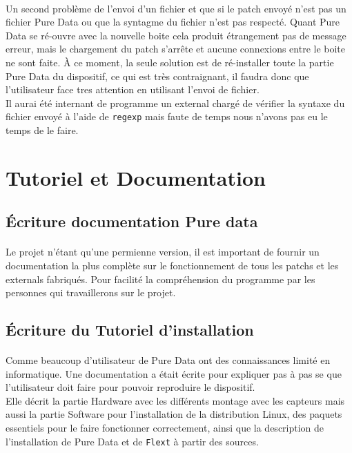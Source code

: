 \documentclass[a4paper, titlepage, oneside, 12pt]{article}%
\begin{document}
\paragraph{}
Un second problème de l'envoi d'un fichier et que si le patch envoyé n'est pas un fichier Pure Data ou que la syntagme du fichier n'est pas respecté. Quant Pure Data se ré-ouvre avec la nouvelle boite cela produit étrangement pas de message erreur, mais le chargement du patch s’arrête et aucune connexions entre le boite ne sont faite. 
À ce moment, la seule solution est de ré-installer toute la partie Pure Data du dispositif, ce qui est très contraignant, il faudra donc que l'utilisateur face tres attention en utilisant l'envoi de fichier.\\
Il aurai été internant de programme un external chargé de vérifier la syntaxe du fichier envoyé à l'aide de \texttt{regexp} mais faute de temps nous n'avons pas eu le temps de le faire.   

\section{Tutoriel et Documentation}
\subsection{Écriture documentation Pure data}
\paragraph{}
Le projet n’étant qu'une permienne version, il est important de fournir un documentation la plus complète sur le fonctionnement de tous les patchs et les externals fabriqués. Pour facilité la compréhension du programme par les personnes qui travaillerons sur le projet.
\subsection{Écriture du Tutoriel d'installation}
\paragraph{}
Comme beaucoup d'utilisateur de Pure Data ont des connaissances limité en informatique. Une documentation a était écrite pour expliquer pas à pas se que l'utilisateur doit faire pour pouvoir reproduire le dispositif.\\
Elle décrit la partie Hardware avec les différents montage avec les capteurs mais aussi la partie Software pour l'installation de la distribution Linux, des paquets essentiels pour le faire fonctionner correctement, ainsi que la description de l'installation de Pure Data et de \texttt{Flext} à partir des sources.
\end{document}

